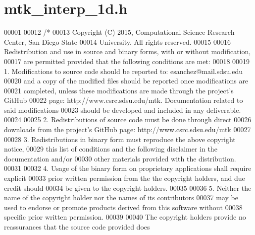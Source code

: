 \hypertarget{mtk__interp__1d_8h_source}{\section{mtk\+\_\+interp\+\_\+1d.\+h}
\label{mtk__interp__1d_8h_source}
}

\begin{DoxyCode}
00001 
00012 \textcolor{comment}{/*}
00013 \textcolor{comment}{Copyright (C) 2015, Computational Science Research Center, San Diego State}
00014 \textcolor{comment}{University. All rights reserved.}
00015 \textcolor{comment}{}
00016 \textcolor{comment}{Redistribution and use in source and binary forms, with or without modification,}
00017 \textcolor{comment}{are permitted provided that the following conditions are met:}
00018 \textcolor{comment}{}
00019 \textcolor{comment}{1. Modifications to source code should be reported to: esanchez@mail.sdsu.edu}
00020 \textcolor{comment}{and a copy of the modified files should be reported once modifications are}
00021 \textcolor{comment}{completed, unless these modifications are made through the project's GitHub}
00022 \textcolor{comment}{page: http://www.csrc.sdsu.edu/mtk. Documentation related to said modifications}
00023 \textcolor{comment}{should be developed and included in any deliverable.}
00024 \textcolor{comment}{}
00025 \textcolor{comment}{2. Redistributions of source code must be done through direct}
00026 \textcolor{comment}{downloads from the project's GitHub page: http://www.csrc.sdsu.edu/mtk}
00027 \textcolor{comment}{}
00028 \textcolor{comment}{3. Redistributions in binary form must reproduce the above copyright notice,}
00029 \textcolor{comment}{this list of conditions and the following disclaimer in the documentation and/or}
00030 \textcolor{comment}{other materials provided with the distribution.}
00031 \textcolor{comment}{}
00032 \textcolor{comment}{4. Usage of the binary form on proprietary applications shall require explicit}
00033 \textcolor{comment}{prior written permission from the the copyright holders, and due credit should}
00034 \textcolor{comment}{be given to the copyright holders.}
00035 \textcolor{comment}{}
00036 \textcolor{comment}{5. Neither the name of the copyright holder nor the names of its contributors}
00037 \textcolor{comment}{may be used to endorse or promote products derived from this software without}
00038 \textcolor{comment}{specific prior written permission.}
00039 \textcolor{comment}{}
00040 \textcolor{comment}{The copyright holders provide no reassurances that the source code provided does}

\end{DoxyCode}
